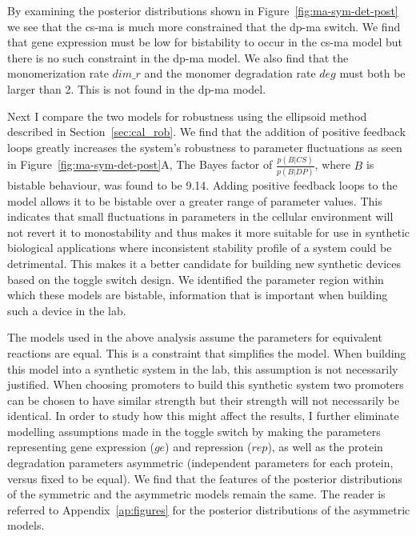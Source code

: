 By examining the posterior distributions shown in Figure~\ref{fig:ma-sym-det-post} we see that the \acrshort{cs-ma} is much more constrained that the \acrshort{dp-ma} switch. We find that gene expression must be low for bistability to occur in the \acrshort{cs-ma} model but there is no such constraint in the \acrshort{dp-ma} model. We also find that the monomerization rate $dim\_r$ and the monomer degradation rate $deg$ must both be larger than 2. This is not found in the \acrshort{dp-ma} model. 

Next I compare the two models for robustness using the ellipsoid method described in Section~\ref{sec:cal_rob}. We find that the addition of positive feedback loops greatly increases the system's robustness to parameter fluctuations as seen in Figure~\ref{fig:ma-sym-det-post}A, The Bayes factor of $\frac{p(B|CS)}{p(B|DP)}$, where $B$ is bistable behaviour, was found to be 9.14. Adding positive feedback loops to the model allows it to be bistable over a greater range of parameter values. This indicates that small fluctuations in parameters in the cellular environment will not revert it to monostability and thus makes it more suitable for use in synthetic biological applications where inconsistent stability profile of a system could be detrimental. This makes it a better candidate for building new synthetic devices based on the toggle switch design. We identified the parameter region within which these models are bistable, information that is important when building such a device in the lab.

The models used in the above analysis assume the parameters for equivalent reactions are equal. This is a constraint that simplifies the model. When building this model into a synthetic system in the lab, this assumption is not necessarily justified. When choosing promoters to build this synthetic system two promoters can be chosen to have similar strength but their strength will not necessarily be identical.  In order to study how this might affect the results, I further eliminate modelling assumptions made in the toggle switch by making the parameters representing gene expression ($ge$) and repression ($rep$), as well as the protein degradation parameters asymmetric (independent parameters for each protein, versus fixed to be equal). We find that the features of the posterior distributions of the symmetric and the asymmetric models remain the same. The reader is referred to Appendix~\ref{ap:figures} for the posterior distributions of the asymmetric models. 

